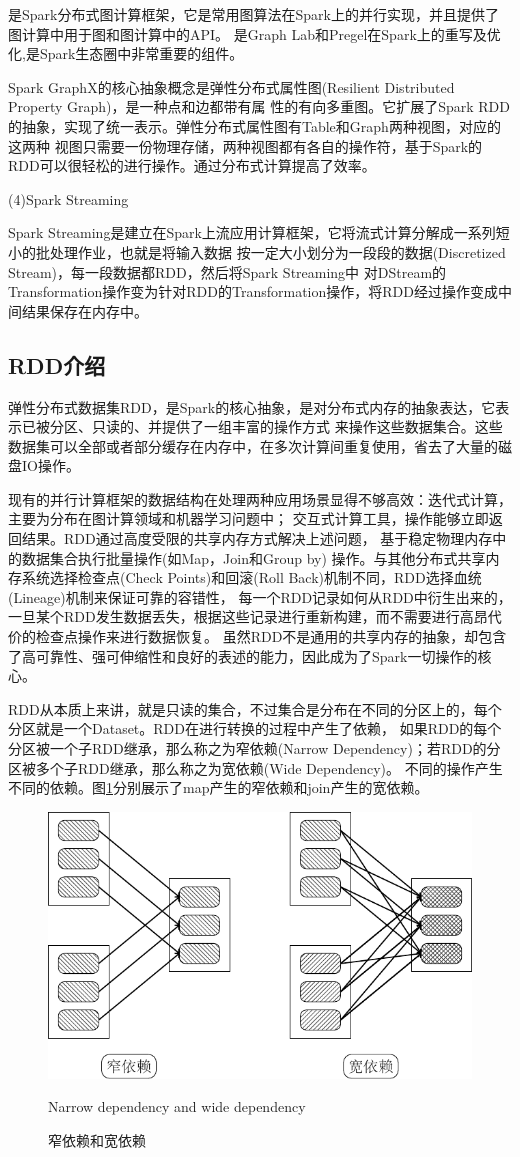 是Spark分布式图计算框架，它是常用图算法在Spark上的并行实现，并且提供了图计算中用于图和图计算中的API。
是Graph Lab和Pregel在Spark上的重写及优化,是Spark生态圈中非常重要的组件\cite{Xin2013GraphX}。

Spark GraphX的核心抽象概念是弹性分布式属性图(Resilient Distributed Property Graph)，是一种点和边都带有属
性的有向多重图。它扩展了Spark RDD的抽象，实现了统一表示。弹性分布式属性图有Table和Graph两种视图，对应的这两种
视图只需要一份物理存储，两种视图都有各自的操作符，基于Spark的RDD可以很轻松的进行操作。通过分布式计算提高了效率。

(4)Spark Streaming

Spark Streaming是建立在Spark上流应用计算框架\cite{Guller2015Sparks}，它将流式计算分解成一系列短小的批处理作业，也就是将输入数据
按一定大小划分为一段段的数据(Discretized Stream)，每一段数据都RDD，然后将Spark Streaming中
对DStream的Transformation操作变为针对RDD的Transformation操作，将RDD经过操作变成中间结果保存在内存中。
\subsection{RDD介绍}
弹性分布式数据集RDD，是Spark的核心抽象，是对分布式内存的抽象表达，它表示已被分区、只读的、并提供了一组丰富的操作方式
来操作这些数据集合。这些数据集可以全部或者部分缓存在内存中，在多次计算间重复使用，省去了大量的磁盘IO操作。

现有的并行计算框架的数据结构在处理两种应用场景显得不够高效：迭代式计算，主要为分布在图计算领域和机器学习问题中；
交互式计算工具，操作能够立即返回结果。RDD通过高度受限的共享内存方式解决上述问题，
基于稳定物理内存中的数据集合执行批量操作(如Map，Join和Group by)
操作。与其他分布式共享内存系统选择检查点(Check Points)和回滚(Roll Back)机制不同，RDD选择血统(Lineage)机制来保证可靠的容错性，
每一个RDD记录如何从RDD中衍生出来的，一旦某个RDD发生数据丢失，根据这些记录进行重新构建，而不需要进行高昂代价的检查点操作来进行数据恢复。
虽然RDD不是通用的共享内存的抽象，却包含了高可靠性、强可伸缩性和良好的表述的能力，因此成为了Spark一切操作的核心。

RDD从本质上来讲，就是只读的集合，不过集合是分布在不同的分区上的，每个分区就是一个Dataset。RDD在进行转换的过程中产生了依赖，
如果RDD的每个分区被一个子RDD继承，那么称之为窄依赖(Narrow Dependency)；若RDD的分区被多个子RDD继承，那么称之为宽依赖(Wide Dependency)。
不同的操作产生不同的依赖。图\ref{fig:dependency}分别展示了map产生的窄依赖和join产生的宽依赖\cite{Zaharia2012Resilient}。
\begin{figure}
\centering
\includegraphics[width=0.6 \linewidth]{figures/rdd.pdf} \\
\caption{窄依赖和宽依赖}{Narrow dependency and wide dependency}
\label{fig:dependency}
\end{figure}

